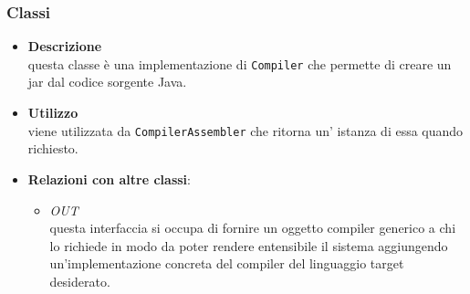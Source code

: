 \subsubsection{Classi}
\label{\nogloxy{swedesigner::server::compiler::java::JavaCompiler}}
\begin{itemize}
\item \textbf{Descrizione}\\
questa classe è una implementazione di \texttt{Compiler} che permette di creare un jar dal codice sorgente Java.
\item \textbf{Utilizzo}\\
viene utilizzata da \texttt{CompilerAssembler} che ritorna un' istanza di essa quando richiesto.
\item \textbf{Relazioni con altre classi}:
\begin{itemize}
\item \textit{OUT} \hyperref[\nogloxy{swedesigner::server::compiler::Compiler}]{}\\
questa interfaccia si occupa di fornire un oggetto compiler generico a chi lo richiede in modo da poter rendere entensibile il sistema aggiungendo un'implementazione concreta del compiler del linguaggio target desiderato.
\end{itemize}
\end{itemize}
\subsection{}
\label{\nogloxy{swedesigner::server::controller}}
